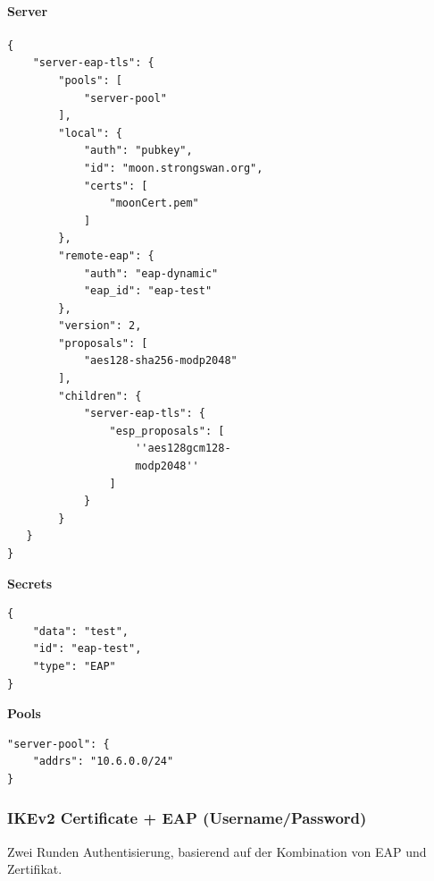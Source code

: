 \begin{minipage}[t]{0.5\textwidth}
\vspace{0pt}
\paragraph{Server}\mbox{}\medskip
\begin{lstlisting}[style=BashInputStyle]
{
    "server-eap-tls": {
        "pools": [
            "server-pool"
        ],
        "local": {
            "auth": "pubkey",
            "id": "moon.strongswan.org",
            "certs": [
                "moonCert.pem"
            ]
        },
        "remote-eap": {
            "auth": "eap-dynamic"
            "eap_id": "eap-test"
        },
        "version": 2,
        "proposals": [
            "aes128-sha256-modp2048"
        ],
        "children": {
            "server-eap-tls": {
                "esp_proposals": [
                    ''aes128gcm128-
                    modp2048''
                ]
            }
        }
   }
}
\end{lstlisting}
\hspace*{18pt}\textbf{Secrets}\mbox{}\medskip
\begin{lstlisting}[style=BashInputStyle]
{
    "data": "test",
    "id": "eap-test",
    "type": "EAP"
}
\end{lstlisting}
\hspace*{18pt}\textbf{Pools}\mbox{}\medskip
\begin{lstlisting}[style=BashInputStyle]
"server-pool": {
    "addrs": "10.6.0.0/24"
}
\end{lstlisting}
\end{minipage}
\newpage


\subsubsection{IKEv2 Certificate + EAP (Username/Password)}
Zwei Runden Authentisierung, basierend auf der Kombination von EAP und Zertifikat.\\

